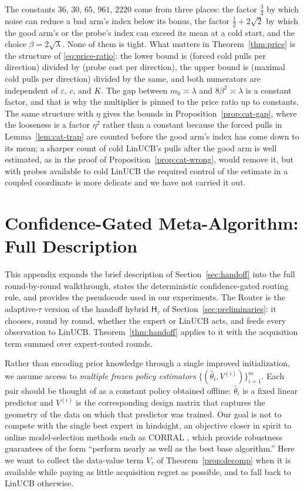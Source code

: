 \documentclass{article}
\theoremstyle{definition}
\theoremstyle{remark}
\newcommand{\eps}{\varepsilon}
\theoremstyle{remark}
\newcommand{\Hyb}{\mathsf{H}}
\begin{document}
The constants $36$, $30$, $65$, $961$, $2220$ come from three places: the
factor $\tfrac34$ by which noise can reduce a bad arm's index below its bonus,
the factor $\tfrac12+2\sqrt2$ by which the good arm's or the probe's index can
exceed its mean at a cold start, and the choice $\beta=2\sqrt\lambda$. None of
them is tight. What matters in Theorem~\ref{thm:price} is the structure of
\eqref{eq:price-ratio}: the lower bound is (forced cold pulls per direction)
divided by (probe cost per direction), the upper bound is (maximal cold pulls
per direction) divided by the same, and both numerators are independent of
$\eps$, $c$, and $K$. The gap between $m_0\asymp\lambda$ and $8\beta^2\asymp\lambda$
is a constant factor, and that is why the multiplier is pinned to the price
ratio up to constants. The same structure with $\eta$ gives the bounds in
Proposition~\ref{prop:cat-gap}, where the looseness is a factor $\eta^2$ rather
than a constant because the forced pulls in Lemma~\ref{lem:cat-trap} are
counted before the good arm's index has come down to its mean; a sharper
count of cold LinUCB's pulls after the good arm is well estimated, as in the
proof of Proposition~\ref{prop:cat-wrong}, would remove it, but with probes
available to cold LinUCB the required control of the estimate in a coupled
coordinate is more delicate and we have not carried it out.


\section{Confidence-Gated Meta-Algorithm: Full Description}
\label{app:meta-algorithm}

This appendix expands the brief description of
Section~\ref{sec:handoff} into the full round-by-round walkthrough,
states the deterministic confidence-gated routing rule, and provides
the pseudocode used in our experiments. The Router is the adaptive-$\tau$ version of the handoff hybrid
$\Hyb_\tau$ of Section~\ref{sec:preliminaries}: it chooses, round by round,
whether the expert or LinUCB acts, and feeds every observation to LinUCB.
Theorem~\ref{thm:handoff} applies to it with the acquisition term summed over
expert-routed rounds.

Rather than encoding prior knowledge through a single improved
initialization, we assume access to \emph{multiple frozen policy
estimators} $\{(\widehat\theta_i,V^{(i)})\}_{i=1}^m$. Each pair should
be thought of as a constant policy obtained offline:
$\widehat\theta_i$ is a fixed linear predictor and $V^{(i)}$ is the
corresponding design matrix that captures the geometry of the data on
which that predictor was trained. Our goal is not to compete with the
single best expert in hindsight, an objective closer in spirit to
online model-selection methods such as CORRAL
\cite{agarwal2017corralling,chen2024llmdecision}, which provide
robustness guarantees of the form ``perform nearly as well as the best
base algorithm.'' Here we want to collect the data-value term $V_\tau$ of
Theorem~\ref{prop:decomp} when it is available while paying as little
acquisition regret as possible, and to fall back to LinUCB otherwise.
\end{document}
